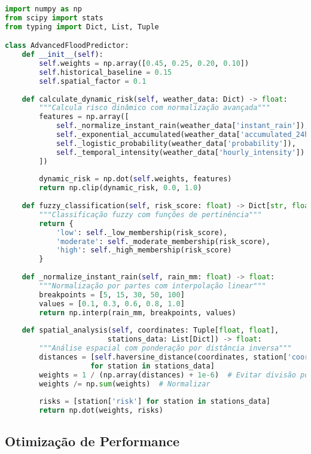 \begin{lstlisting}[caption={Implementação do Núcleo de Predição em Python},label={cod:nucleo_predicao},language=Python]
import numpy as np
from scipy import stats
from typing import Dict, List, Tuple

class AdvancedFloodPredictor:
    def __init__(self):
        self.weights = np.array([0.45, 0.25, 0.20, 0.10])
        self.historical_baseline = 0.15
        self.spatial_factor = 0.1
        
    def calculate_dynamic_risk(self, weather_data: Dict) -> float:
        """Calcula risco dinâmico com normalização avançada"""
        features = np.array([
            self._normalize_instant_rain(weather_data['instant_rain']),
            self._exponential_accumulated(weather_data['accumulated_24h']),
            self._logistic_probability(weather_data['probability']),
            self._temporal_intensity(weather_data['hourly_intensity'])
        ])
        
        dynamic_risk = np.dot(self.weights, features)
        return np.clip(dynamic_risk, 0.0, 1.0)
    
    def fuzzy_classification(self, risk_score: float) -> Dict[str, float]:
        """Classificação fuzzy com funções de pertinência"""
        return {
            'low': self._low_membership(risk_score),
            'moderate': self._moderate_membership(risk_score),
            'high': self._high_membership(risk_score)
        }
    
    def _normalize_instant_rain(self, rain_mm: float) -> float:
        """Normalização por partes com interpolação linear"""
        breakpoints = [5, 15, 30, 50, 100]
        values = [0.1, 0.3, 0.6, 0.8, 1.0]
        return np.interp(rain_mm, breakpoints, values)
    
    def spatial_analysis(self, coordinates: Tuple[float, float], 
                        stations_data: List[Dict]) -> float:
        """Análise espacial com ponderação por distância inversa"""
        distances = [self.haversine_distance(coordinates, station['coords']) 
                    for station in stations_data]
        weights = 1 / (np.array(distances) + 1e-6)  # Evitar divisão por zero
        weights /= np.sum(weights)  # Normalizar
        
        risks = [station['risk'] for station in stations_data]
        return np.dot(weights, risks)
\end{lstlisting}

\subsection{Otimização de Performance}

